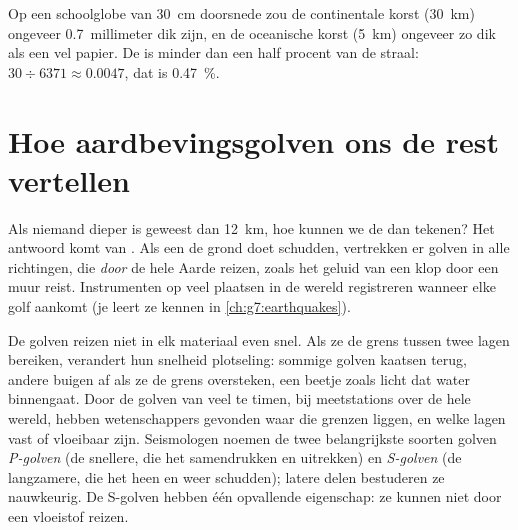 \begin{remark}\label{rem:g6:inside-the-earth:thin-crust}
Op een schoolglobe van 30~cm doorsnede zou de continentale korst (30~km)
ongeveer 0.7~millimeter dik zijn, en de oceanische korst (5~km) ongeveer zo
dik als een vel papier. De  is minder dan een half procent van
de straal: $30 \div 6371 \approx 0.0047$, dat is 0.47~\%.
\end{remark}

\section{Hoe aardbevingsgolven ons de rest vertellen}\label{sec:g6:inside-the-earth:waves}

Als niemand dieper is geweest dan 12~km, hoe kunnen we de  dan tekenen?
Het antwoord komt van . Als een  de grond doet
schudden, vertrekken er golven in alle richtingen, die \emph{door} de hele
Aarde reizen, zoals het geluid van een klop door een muur reist. Instrumenten op veel plaatsen in de wereld registreren wanneer elke golf aankomt (je leert ze kennen in
\cref{ch:g7:earthquakes}).

De golven reizen niet in elk materiaal even snel. Als ze de grens tussen
twee lagen bereiken, verandert hun snelheid plotseling: sommige golven
kaatsen terug, andere buigen af als ze de grens oversteken, een beetje
zoals licht dat water binnengaat. Door de golven van veel  te timen, bij meetstations over de hele wereld, hebben wetenschappers gevonden waar die grenzen liggen,
en welke lagen vast of vloeibaar zijn. Seismologen noemen de twee
belangrijkste soorten golven \emph{P-golven} (de snellere, die het
 samendrukken en uitrekken) en \emph{S-golven} (de langzamere,
die het heen en weer schudden); latere delen bestuderen ze nauwkeurig. De
S-golven hebben één opvallende eigenschap: ze kunnen niet door een
vloeistof reizen.

